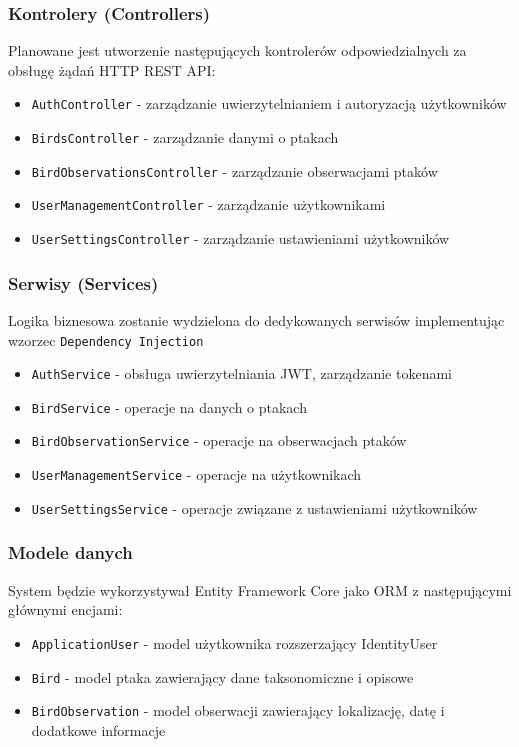 \subsubsection{Kontrolery (Controllers)}
Planowane jest utworzenie następujących kontrolerów odpowiedzialnych za obsługę żądań HTTP REST API:
\begin{itemize}
	\item \texttt{AuthController} - zarządzanie uwierzytelnianiem i autoryzacją użytkowników
	\item \texttt{BirdsController} - zarządzanie danymi o ptakach
	\item \texttt{BirdObservationsController} - zarządzanie obserwacjami ptaków
	\item \texttt{UserManagementController} - zarządzanie użytkownikami
	\item \texttt{UserSettingsController} - zarządzanie ustawieniami użytkowników
\end{itemize}

\subsubsection{Serwisy (Services)}
Logika biznesowa zostanie wydzielona do dedykowanych serwisów implementując wzorzec \texttt{Dependency Injection}
\begin{itemize}
	\item \texttt{AuthService} - obsługa uwierzytelniania JWT, zarządzanie tokenami
	\item \texttt{BirdService} - operacje na danych o ptakach
	\item \texttt{BirdObservationService} - operacje na obserwacjach ptaków
	\item \texttt{UserManagementService} - operacje na  użytkownikach
	\item \texttt{UserSettingsService} - operacje związane z ustawieniami użytkowników
\end{itemize}

\subsubsection{Modele danych}
System będzie wykorzystywał Entity Framework Core jako ORM z następującymi głównymi encjami:
\begin{itemize}
	\item \texttt{ApplicationUser} - model użytkownika rozszerzający IdentityUser
	\item \texttt{Bird} - model ptaka zawierający dane taksonomiczne i opisowe
	\item \texttt{BirdObservation} - model obserwacji zawierający lokalizację, datę i dodatkowe informacje
\end{itemize}

